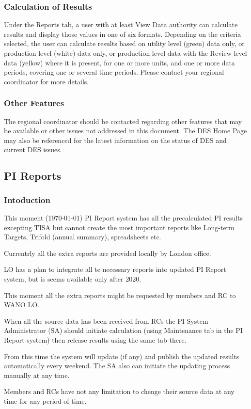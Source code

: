 \subsubsection{Calculation of Results }

Under the Reports tab, a user with at least View Data authority can calculate results and display those values in one of six formats.  Depending on the criteria selected, the user can calculate results based on utility level (green) data only, or production level (white) data only, or production level data with the Review level data (yellow) where it is present, for one or more units, and one or more data periods, covering one or several time periods. Please contact your regional coordinator for more details.

\subsubsection{Other Features }

The regional coordinator should be contacted regarding other features that may be available or other issues not addressed in this document. The DES Home Page may also be referenced for the latest information on the status of DES and current DES issues.


\subsection{PI Reports}
\subsubsection{Intoduction}

This moment (\today) PI Report system has all the precalculated
PI results excepting TISA but cannot create the most important reports
like Long-term Targets, Trifold (annual summary), spreadsheets etc.

Currentrly all the extra reports are provided locally by London
office.

LO has a plan to integrate all te necessary reports into updated PI
Report system, but is seems available only after 2020.

This moment all the extra reports might be requested by members and RC
to WANO LO.

When all the source data has been received from RCs the PI System
Administrator (SA) should initiate calculation (using Maintenance tab in
the PI Report system) then release results using the same tab there.

From this time the system will update (if any) and publish the updated
results automatically every weekend. The SA also can initiate the
updating process manually at any time.

Members and RCs have not any limitation to chenge their source data at
any time for any period of time.